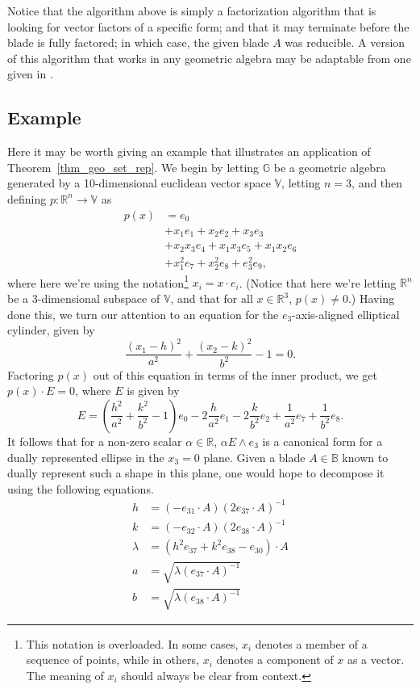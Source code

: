 \documentclass{birkjour}
\theoremstyle{definition}
\theoremstyle{remark}
\numberwithin{equation}{section}
\newcommand{\R}{\mathbb{R}}
\newcommand{\B}{\mathbb{B}}
\newcommand{\G}{\mathbb{G}}
\newcommand{\V}{\mathbb{V}}
\begin{document}
Notice that the algorithm above is simply a factorization algorithm that is looking for
vector factors of a specific form; and that it may terminate before the blade is fully factored;
in which case, the given blade $A$ was reducible.  A version of this algorithm that works
in any geometric algebra may be adaptable from one given in \cite{}.

\subsection{Example}

Here it may be worth giving an example that illustrates an application of Theorem~\ref{thm_geo_set_rep}.
We begin by letting $\G$ be a geometric algebra generated by a 10-dimensional euclidean vector space $\V$, letting $n=3$, and then defining
$p:\R^n\to\V$ as
\begin{align}
p(x) &= e_0 \nonumber\\
 &+ x_1e_1 + x_2e_2 + x_3e_3 \nonumber\\
 &+ x_2x_3e_4 + x_1x_3e_5 + x_1x_2e_6 \nonumber\\
 &+ x_1^2e_7 + x_2^2e_8 + e_3^2e_9,
\end{align}
where here we're using the notation\footnote{This notation is overloaded.  In some cases, $x_i$ denotes a member
of a sequence of points, while in others, $x_i$ denotes a component of $x$ as a vector.  The meaning of $x_i$ should
always be clear from context.} $x_i=x\cdot e_i$.  (Notice that here we're letting $\R^n$ be
a 3-dimensional subspace of $\V$, and that for all $x\in\R^3$, $p(x)\neq 0$.)  Having done this,
we turn our attention to an equation for the $e_3$-axis-aligned elliptical cylinder, given by
\begin{equation}
\frac{(x_1-h)^2}{a^2}+\frac{(x_2-k)^2}{b^2}-1=0.
\end{equation}
Factoring $p(x)$ out of this equation in terms of the inner product, we get $p(x)\cdot E=0$,
where $E$ is given by
\begin{equation}
E = \left(\frac{h^2}{a^2}+\frac{k^2}{b^2}-1\right)e_0-2\frac{h}{a^2}e_1-2\frac{k}{b^2}e_2+\frac{1}{a^2}e_7+\frac{1}{b^2}e_8.
\end{equation}
It follows that for a non-zero scalar $\alpha\in\R$, $\alpha E\wedge e_3$ is a canonical form for a dually represented ellipse in the $x_3=0$ plane.
Given a blade $A\in\B$ known to dually represent such a shape in this plane, one would hope to decompose it using the following equations.
\begin{align}
h &= (-e_{31}\cdot A)(2e_{37}\cdot A)^{-1}\label{equ_decompose_first} \\
k &= (-e_{32}\cdot A)(2e_{38}\cdot A)^{-1} \\
\lambda &= (h^2e_{37}+k^2e_{38}-e_{30})\cdot A \\
a &= \sqrt{\lambda(e_{37}\cdot A)^{-1}} \\
b &= \sqrt{\lambda(e_{38}\cdot A)^{-1}}\label{equ_decompose_last}
\end{align}
\end{document}
